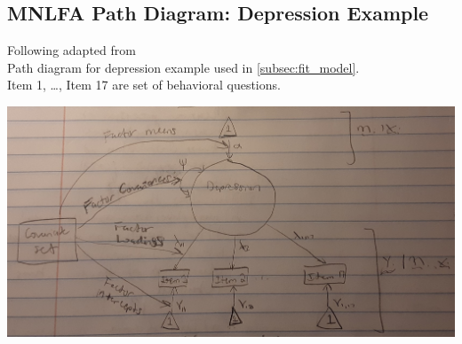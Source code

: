 \documentclass[12pt]{article}
\begin{document}
\subsection{MNLFA Path Diagram: Depression Example}
\noindent Following adapted from \cite{curran_2014}\\

\noindent Path diagram for depression example used in \ref{subsec:fit_model}.\\

\noindent Item 1, \ldots, Item 17 are set of behavioral questions.
\begin{center}
\includegraphics[scale=0.38]{mnlfa_path_diagram.jpg}
\end{center}



\end{document}
